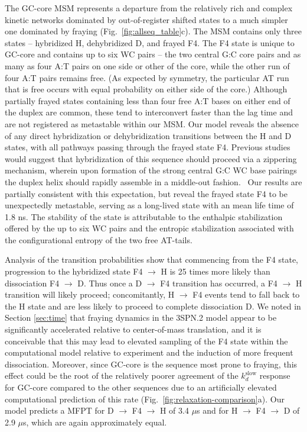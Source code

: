 \documentclass[journal=jpcbfk,manuscript=article]{achemso}
\begin{document}
The GC-core MSM represents a departure from the relatively rich and complex kinetic networks dominated by out-of-register shifted states to a much simpler one dominated by fraying (Fig.~\ref{fig:allseq_table}c). The MSM contains only three states -- hybridized H, dehybridized D, and frayed F4. The F4 state is unique to GC-core and contains up to six WC pairs -- the two central G:C core pairs and as many as four A:T pairs on one side or other of the core, while the other run of four A:T pairs remains free. (As expected by symmetry, the particular AT run that is free occurs with equal probability on either side of the core.) Although partially frayed states containing less than four free A:T bases on either end of the duplex are common, these tend to interconvert faster than the lag time and are not registered as metastable within our MSM. Our model reveals the absence of any direct hybridization or dehybridization transitions between the H and D states, with all pathways passing through the frayed state F4. Previous studies would suggest that hybridization of this sequence should proceed via a zippering mechanism, wherein upon formation of the strong central G:C WC base pairings the duplex helix should rapidly assemble in a middle-out fashion.~\citep{Romano2013DNADependence, Yin2011KineticsHybridization} Our results are partially consistent with this expectation, but reveal the frayed state F4 to be unexpectedly metastable, serving as a long-lived state with an mean life time of 1.8 ns. The stability of the state is attributable to the enthalpic stabilization offered by the up to six WC pairs and the entropic stabilization associated with the configurational entropy of the two free AT-tails.

Analysis of the transition probabilities show that commencing from the F4 state, progression to the hybridized state F4 $\rightarrow$ H is 25 times more likely than dissociation F4 $\rightarrow$ D. Thus once a D $\rightarrow$ F4 transition has occurred, a F4 $\rightarrow$ H transition will likely proceed; concomitantly, H $\rightarrow$ F4 events tend to fall back to the H state and are less likely to proceed to complete dissociation D. We noted in Section \ref{sec:time} that fraying dynamics in the 3SPN.2 model appear to be significantly accelerated relative to center-of-mass translation, and it is conceivable that this may lead to elevated sampling of the F4 state within the computational model relative to experiment and the induction of more frequent dissociation. Moreover, since GC-core is the sequence most prone to fraying, this effect could be the root of the relatively poorer agreement of the $k_d^\mathrm{slow}$ response for GC-core compared to the other sequences due to an artificially elevated computational prediction of this rate (Fig.~\ref{fig:relaxation-comparison}a). Our model predicts a MFPT for D $\rightarrow$ F4 $\rightarrow$ H of 3.4 $\mu$s and for H $\rightarrow$ F4 $\rightarrow$ D of 2.9 $\mu$s, which are again approximately equal.
\end{document}
